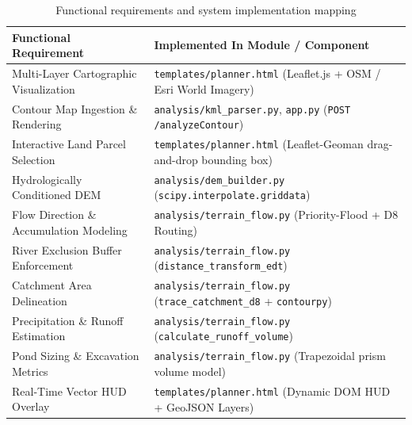 \documentclass[manuscript,screen,review]{acmart}
\begin{document}
\begin{table}[htb]
  \caption{Functional requirements and system implementation mapping}
  \label{tab:requirements}
  \footnotesize
  \renewcommand{\arraystretch}{0.90}
  \begin{tabular}{p{5.5cm}p{7.5cm}}
    \toprule
    Functional Requirement & Implemented In Module / Component \\
    \midrule
    Multi-Layer Cartographic Visualization & \texttt{templates/planner.html} (Leaflet.js + OSM / Esri World Imagery) \\
    Contour Map Ingestion \& Rendering & \texttt{analysis/kml\_parser.py}, \texttt{app.py} (\texttt{POST /analyzeContour}) \\
    Interactive Land Parcel Selection & \texttt{templates/planner.html} (Leaflet-Geoman drag-and-drop bounding box) \\
    Hydrologically Conditioned DEM & \texttt{analysis/dem\_builder.py} (\texttt{scipy.interpolate.griddata}) \\
    Flow Direction \& Accumulation Modeling & \texttt{analysis/terrain\_flow.py} (Priority-Flood + D8 Routing) \\
    River Exclusion Buffer Enforcement & \texttt{analysis/terrain\_flow.py} (\texttt{distance\_transform\_edt}) \\
    Catchment Area Delineation & \texttt{analysis/terrain\_flow.py} (\texttt{trace\_catchment\_d8} + \texttt{contourpy}) \\
    Precipitation \& Runoff Estimation & \texttt{analysis/terrain\_flow.py} (\texttt{calculate\_runoff\_volume}) \\
    Pond Sizing \& Excavation Metrics & \texttt{analysis/terrain\_flow.py} (Trapezoidal prism volume model) \\
    Real-Time Vector HUD Overlay & \texttt{templates/planner.html} (Dynamic DOM HUD + GeoJSON Layers) \\
    \bottomrule
  \end{tabular}
\end{table}
\end{document}
